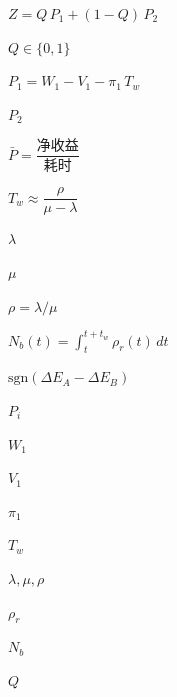 
$Z=Q\,P_1+(1-Q)\,P_2$

$Q\in\{0,1\}$

$P_1=W_1-V_1-\pi_1\,T_w$

$P_2$

$\bar P=\dfrac{\text{净收益}}{\text{耗时}}$

$T_w\approx\dfrac{\rho}{\mu-\lambda}$

$\lambda$

$\mu$

$\rho=\lambda/\mu$

$N_b(t)=\int_t^{t+t_w}\rho_r(t)\,dt$

$\mathrm{sgn}(\Delta E_A-\Delta E_B)$

$P_i$

$W_1$

$V_1$

$\pi_1$

$T_w$

$\lambda,\mu,\rho$

$\rho_r$

$N_b$

$Q$

